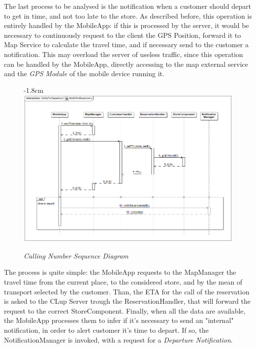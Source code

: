 \documentclass{article}
\begin{document}
	\bigskip
	
	

	The last process to be analysed is the notification when a customer should depart to get in time, and not too late to the store. As described before, this operation is entirely handled by the MobileApp: if this is processed by the server, it would be necessary to continuously request to the client the GPS Position, forward it to Map Service to calculate the travel time, and if necessary send to the customer a notification. This may overload the server of useless traffic, since this operation can be handled by the MobileApp, directly accessing to the map external service and the \emph{GPS Module} of the mobile device running it.
	\begin{figure}[H]
		\begin{adjustwidth} {-1.8cm}{}
			\centering
			\includegraphics[scale=0.5]{Sequence Diagrams/sd__NotifyForDeparture__NotifyForDeparture.png}
		\end{adjustwidth}
		\caption{\emph{Calling Number Sequence Diagram}}
	\end{figure}

	The process is quite simple: the MobileApp requests to the MapManager the travel time from the current place, to the considered store, and by the mean of transport selected by the customer. Than, the ETA for the call of the reservation is asked to the CLup Server trough the ReservationHandler, that will forward the request to the correct StoreComponent. Finally, when all the data are available, the MobileApp processes them to infer if it's necessary to send an "internal" notification, in order to alert customer it's time to depart. If so, the NotificationManager is invoked, with a request for a \emph{Departure Notification}.
\end{document}
